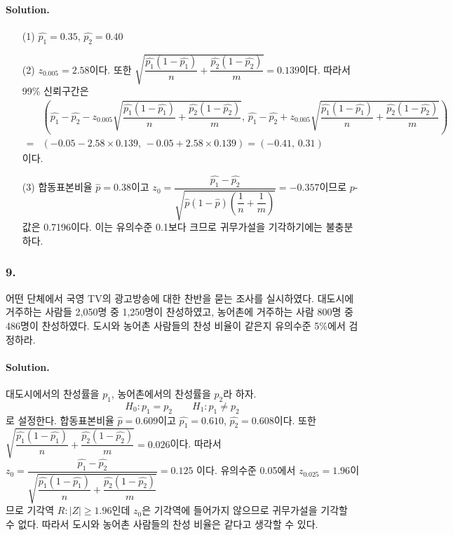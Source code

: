 \paragraph{Solution.}
\begin{itemize}
    \item[(1)] {
        $\hat{p_1}=0.35$, $\hat{p_2}=0.40$
    }
    \item[(2)] {
        $z_{0.005}=2.58$이다.
        또한 $\sqrt{\dfrac{\hat{p_1}\left(1-\hat{p_1}\right)}{n}+\dfrac{\hat{p_2}\left(1-\hat{p_2}\right)}{m}}=0.139$이다.
        따라서 99\% 신뢰구간은
        \begin{align*}
            & \left(
                \hat{p_1}-\hat{p_2}-z_{0.005}\sqrt{\dfrac{\hat{p_1}\left(1-\hat{p_1}\right)}{n}+\dfrac{\hat{p_2}\left(1-\hat{p_2}\right)}{m}},\,
                \hat{p_1}-\hat{p_2}+z_{0.005}\sqrt{\dfrac{\hat{p_1}\left(1-\hat{p_1}\right)}{n}+\dfrac{\hat{p_2}\left(1-\hat{p_2}\right)}{m}}
            \right) \\
            =& \left(-0.05-2.58\times0.139,\, -0.05+2.58\times0.139\right) = \left(-0.41,\,0.31\right)
        \end{align*}
        이다.
    }
    \item[(3)] {
        합동표본비율 $\hat{p}=0.38$이고 $z_0
        =\dfrac{\hat{p_1}-\hat{p_2}}{\sqrt{\hat{p}\left(1-\hat{p}\right)\left(\dfrac{1}{n}+\dfrac{1}{m}\right)}}
        =-0.357$이므로 $p$-값은 0.7196이다. 이는 유의수준 0.1보다 크므로 귀무가설을 기각하기에는 불충분하다.
    }
\end{itemize}

\subsubsection{9.} 어떤 단체에서 국영 TV의 광고방송에 대한 찬반을 묻는 조사를 실시하였다. 대도시에 거주하는 사람들 2,050명 중 1,250명이 찬성하였고,
농어촌에 거주하는 사람 800명 중 486명이 찬성하였다. 도시와 농어촌 사람들의 찬성 비율이 같은지 유의수준 5\%에서 검정하라.

\paragraph{Solution.} 대도시에서의 찬성률을 $p_1$, 농어촌에서의 찬성률을 $p_2$라 하자.
\[H_0:p_1=p_2 \qquad H_1:p_1\neq p_2\]
로 설정한다. 합동표본비율 $\hat{p}=0.609$이고 $\hat{p_1}=0.610$, $\hat{p_2}=0.608$이다.
또한 $\sqrt{\dfrac{\hat{p_1}\left(1-\hat{p_1}\right)}{n}+\dfrac{\hat{p_2}\left(1-\hat{p_2}\right)}{m}}=0.026$이다.
따라서 $z_0=\dfrac{\hat{p_1}-\hat{p_2}}{\sqrt{\dfrac{\hat{p_1}\left(1-\hat{p_1}\right)}{n}+\dfrac{\hat{p_2}\left(1-\hat{p_2}\right)}{m}}}=0.125$
이다. 유의수준 0.05에서 $z_{0.025}=1.96$이므로 기각역 $R:\left|Z\right|\geq1.96$인데 $z_0$은 기각역에 들어가지 않으므로 귀무가설을 기각할 수 없다.
따라서 도시와 농어촌 사람들의 찬성 비율은 같다고 생각할 수 있다.